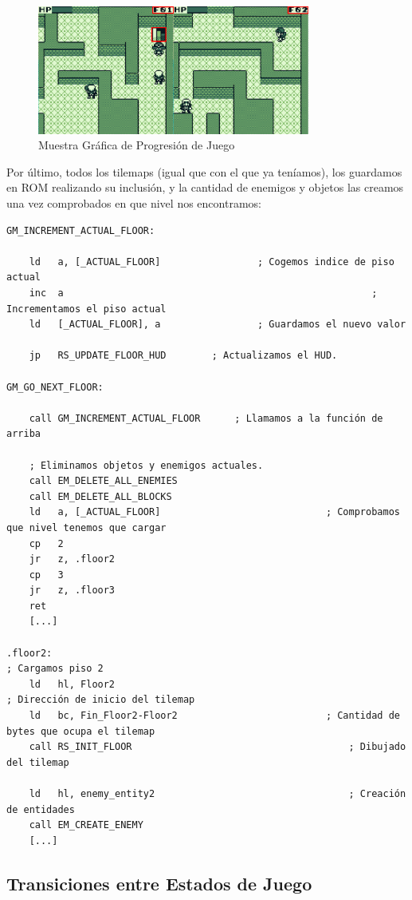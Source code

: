 \begin{figure}[h]
\centering
\includegraphics[width=0.8\textwidth]{include/images/desarrollo/level_progression.png}
\caption{Muestra Gráfica de Progresión de Juego}
\label{figure:levelprogression}
\end{figure}

Por último, todos los tilemaps (igual que con el que ya teníamos), los guardamos en ROM realizando su inclusión, y la cantidad de enemigos y objetos las creamos una vez comprobados en que nivel nos encontramos:

\begin{lstlisting}[caption={Carga de Niveles}, label={code:loadlevels}]
GM_INCREMENT_ACTUAL_FLOOR:
	
	ld 	 a, [_ACTUAL_FLOOR] 				; Cogemos indice de piso actual
	inc  a 														; Incrementamos el piso actual
	ld 	 [_ACTUAL_FLOOR], a 				; Guardamos el nuevo valor

	jp 	 RS_UPDATE_FLOOR_HUD 		; Actualizamos el HUD.

GM_GO_NEXT_FLOOR:

	call GM_INCREMENT_ACTUAL_FLOOR 		; Llamamos a la función de arriba
	
	; Eliminamos objetos y enemigos actuales.
	call EM_DELETE_ALL_ENEMIES
	call EM_DELETE_ALL_BLOCKS
	ld 	 a, [_ACTUAL_FLOOR] 							; Comprobamos que nivel tenemos que cargar
	cp 	 2
	jr 	 z, .floor2
	cp 	 3
	jr   z, .floor3
	ret
	[...]

.floor2: 																	; Cargamos piso 2
	ld 	 hl, Floor2 													; Dirección de inicio del tilemap
	ld 	 bc, Fin_Floor2-Floor2 							; Cantidad de bytes que ocupa el tilemap
	call RS_INIT_FLOOR 										; Dibujado del tilemap
	
	ld 	 hl, enemy_entity2 									; Creación de entidades
	call EM_CREATE_ENEMY
	[...]
\end{lstlisting}

\subsection{Transiciones entre Estados de Juego}

